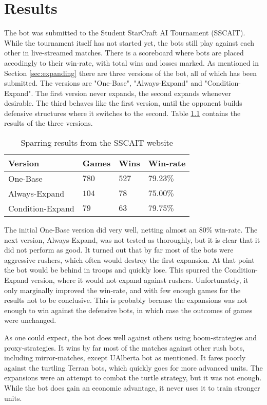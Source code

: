 \chapter{Results}
\label{ch:results}
The bot was submitted to the Student StarCraft AI Tournament (SSCAIT). While the tournament itself has not started yet, the bots still play against each other in live-streamed matches. There is a scoreboard where bots are placed accodingly to their win-rate, with total wins and losses marked. As mentioned in Section \ref{sec:expanding} there are three versions of the bot, all of which has been submitted. The versions are "One-Base", "Always-Expand" and "Condition-Expand". The first version never expands, the second expands whenever desirable. The third behaves like the first version, until the opponent builds defensive structures where it switches to the second. Table \ref{tab:results} contains the results of the three versions.

\begin{table}
\begin{center}
\begin{tabularx}{\linewidth}{|X||l|l|l|}
	\hline
	Version				& Games	& Wins	& Win-rate	\\
	\hline
	One-Base			& $780$	& $527$	& $79.23\%$	\\
	Always-Expand		& $104$	& $78$	& $75.00\%$	\\
	Condition-Expand	& $79$	& $63$	& $79.75\%$	\\
	\hline
\end{tabularx}
\end{center}
\caption{Sparring results from the SSCAIT website}
\label{tab:results}
\end{table}

The initial One-Base version did very well, netting almost an $80\%$ win-rate. The next version, Always-Expand, was not tested as thoroughly, but it is clear that it did not perform as good. It turned out that by far most of the bots were aggressive rushers, which often would destroy the first expansion. At that point the bot would be behind in troops and quickly lose. This spurred the Condition-Expand version, where it would not expand against rushers. Unfortunately, it only marginally improved the win-rate, and with few enough games for the results not to be conclusive. This is probably because the expansions was not enough to win against the defensive bots, in which case the outcomes of games were unchanged.

As one could expect, the bot does well against others using boom-strategies and proxy-strategies. It wins by far most of the matches against other rush bots, including mirror-matches, except UAlberta bot as mentioned. It fares poorly against the turtling Terran bots, which quickly goes for more advanced units. The expansions were an attempt to combat the turtle strategy, but it was not enough. While the bot does gain an economic advantage, it never uses it to train stronger units.

